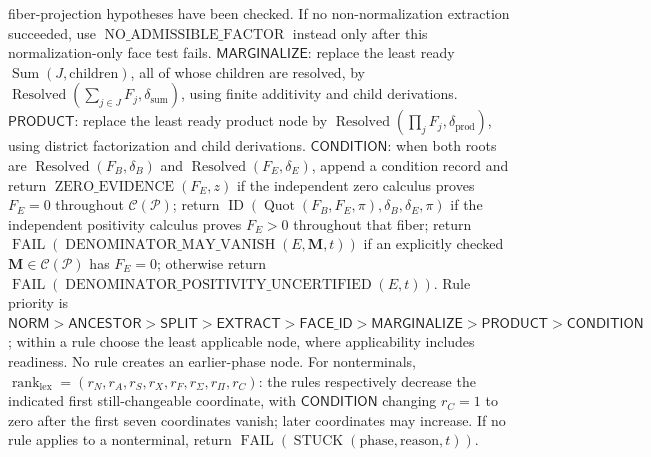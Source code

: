 fiber-projection hypotheses have been checked. If no non-normalization extraction succeeded, use \(\operatorname{NO\_ADMISSIBLE\_FACTOR}\) instead only after this normalization-only face test fails. \(\mathsf{MARGINALIZE}\): replace the least ready \(\operatorname{Sum}(J,\mathrm{children})\), all of whose children are resolved, by \(\operatorname{Resolved}(\sum_{j\in J}F_j,\delta_{\mathrm{sum}})\), using finite additivity and child derivations. \(\mathsf{PRODUCT}\): replace the least ready product node by \(\operatorname{Resolved}(\prod_jF_j,\delta_{\mathrm{prod}})\), using district factorization and child derivations. \(\mathsf{CONDITION}\): when both roots are \(\operatorname{Resolved}(F_B,\delta_B)\) and \(\operatorname{Resolved}(F_E,\delta_E)\), append a condition record and return \(\operatorname{ZERO\_EVIDENCE}(F_E,z)\) if the independent zero calculus proves \(F_E=0\) throughout \(\mathcal C(\mathcal P)\); return \(\operatorname{ID}(\operatorname{Quot}(F_B,F_E,\pi),\delta_B,\delta_E,\pi)\) if the independent positivity calculus proves \(F_E>0\) throughout that fiber; return \(\operatorname{FAIL}(\operatorname{DENOMINATOR\_MAY\_VANISH}(E,\mathbf M,t))\) if an explicitly checked \(\mathbf M\in\mathcal C(\mathcal P)\) has \(F_E=0\); otherwise return \(\operatorname{FAIL}(\operatorname{DENOMINATOR\_POSITIVITY\_UNCERTIFIED}(E,t))\). Rule priority is \(\mathsf{NORM}>\mathsf{ANCESTOR}>\mathsf{SPLIT}>\mathsf{EXTRACT}>\mathsf{FACE\_ID}>\mathsf{MARGINALIZE}>\mathsf{PRODUCT}>\mathsf{CONDITION}\); within a rule choose the least applicable node, where applicability includes readiness. No rule creates an earlier-phase node. For nonterminals, \(\operatorname{rank}_{\mathrm{lex}}=(r_N,r_A,r_S,r_X,r_F,r_{\Sigma},r_{\Pi},r_C)\): the rules respectively decrease the indicated first still-changeable coordinate, with \(\mathsf{CONDITION}\) changing \(r_C=1\) to zero after the first seven coordinates vanish; later coordinates may increase. If no rule applies to a nonterminal, return \(\operatorname{FAIL}(\operatorname{STUCK}(\mathrm{phase},\mathrm{reason},t))\).